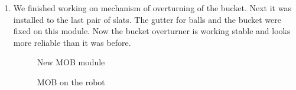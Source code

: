 \begin{enumerate}
\begin{enumerate}
        \item We finished working on mechanism of overturning of the bucket. Next it was installed to the last pair of slats. The gutter for balls and the bucket were fixed on this module. Now the bucket overturner is working stable and looks more reliable than it was before.
        \begin{figure}[H]
        	\begin{minipage}[h]{0.47\linewidth}
        		\caption{New MOB module}
        	\end{minipage}
        	\hfill
        	\begin{minipage}[h]{0.47\linewidth}
        		\caption{MOB on the robot}
        	\end{minipage}
        \end{figure}
        

\end{enumerate}
\end{enumerate}
